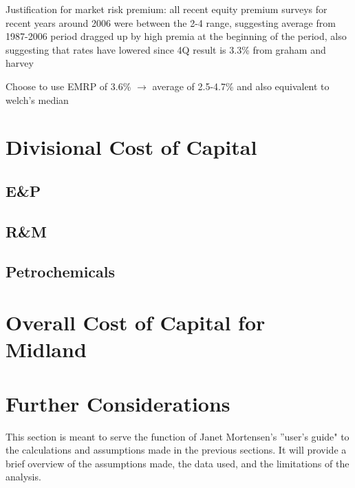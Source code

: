 \documentclass{article}
\begin{document}
Justification for market risk premium: all recent equity premium surveys for recent years around 2006  were between the 2-4 range, suggesting average from 1987-2006 period dragged up by high premia at the beginning of the period, also suggesting that rates have lowered since
4Q result is 3.3\% from graham and harvey

Choose to use EMRP of 3.6\% $\rightarrow$ average of 2.5-4.7\% and also equivalent to welch’s median


\hrulefill
\section{Divisional Cost of Capital}
\subsection{E\&P}
\subsection{R\&M}
\subsection{Petrochemicals}

\hrulefill
\section{Overall Cost of Capital for Midland}

\hrulefill
\section{Further Considerations}
This section is meant to serve the function of Janet Mortensen's ''user's guide" to the calculations and assumptions made in the previous sections. It will provide a brief overview of the assumptions made, the data used, and the limitations of the analysis.
\end{document}
